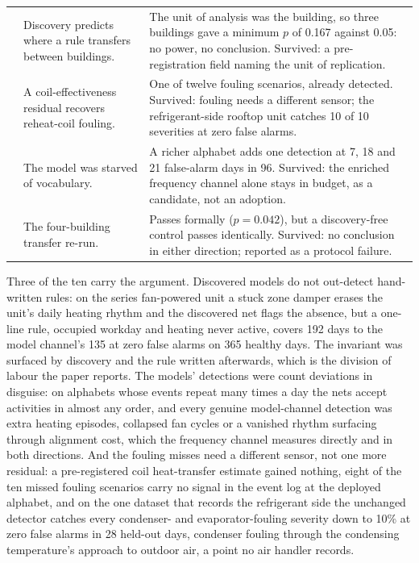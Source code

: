 \documentclass[11pt,letterpaper]{article}
\begin{document}
\begin{table}[htbp]
\begin{tabular}{@{}>{\raggedright\arraybackslash}p{}>{\raggedright\arraybackslash}p{}>{\raggedright\arraybackslash}p{}@{}}
7 & Discovery predicts where a rule transfers between buildings. & The unit of analysis was the building, so three buildings gave a minimum $p$ of 0.167 against 0.05: no power, no conclusion. Survived: a pre-registration field naming the unit of replication. \\
8 & A coil-effectiveness residual recovers reheat-coil fouling. & One of twelve fouling scenarios, already detected. Survived: fouling needs a different sensor; the refrigerant-side rooftop unit catches 10 of 10 severities at zero false alarms. \\
9 & The model was starved of vocabulary. & A richer alphabet adds one detection at 7, 18 and 21 false-alarm days in 96. Survived: the enriched frequency channel alone stays in budget, as a candidate, not an adoption. \\
10 & The four-building transfer re-run. & Passes formally ($p = 0.042$), but a discovery-free control passes identically. Survived: no conclusion in either direction; reported as a protocol failure. \\
\hline
\end{tabular}

\end{table}

Three of the ten carry the argument. Discovered models do not out-detect hand-written rules: on the series fan-powered unit a stuck zone damper erases the unit's daily heating rhythm and the discovered net flags the absence, but a one-line rule, occupied workday and heating never active, covers 192 days to the model channel's 135 at zero false alarms on 365 healthy days. The invariant was surfaced by discovery and the rule written afterwards, which is the division of labour the paper reports. The models' detections were count deviations in disguise: on alphabets whose events repeat many times a day the nets accept activities in almost any order, and every genuine model-channel detection was extra heating episodes, collapsed fan cycles or a vanished rhythm surfacing through alignment cost, which the frequency channel measures directly and in both directions. And the fouling misses need a different sensor, not one more residual: a pre-registered coil heat-transfer estimate gained nothing, eight of the ten missed fouling scenarios carry no signal in the event log at the deployed alphabet, and on the one dataset that records the refrigerant side the unchanged detector catches every condenser- and evaporator-fouling severity down to 10\% at zero false alarms in 28 held-out days, condenser fouling through the condensing temperature's approach to outdoor air, a point no air handler records.
\end{document}
